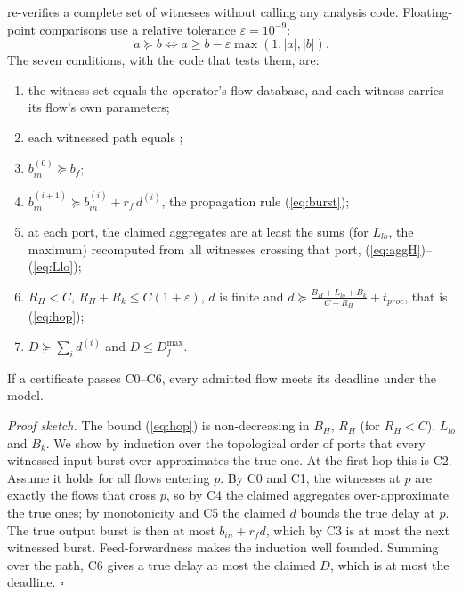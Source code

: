 \documentclass[9pt,a4paper,twocolumn,twoside]{tau-class/tau}
\providecommand{\eqref}[1]{(\ref{#1})}
\begin{document}
         re-verifies a complete set of witnesses without calling any analysis code. Floating-point comparisons use a relative tolerance $\varepsilon = 10^{-9}$:
        \begin{equation}\label{eq:ge}
            a \succeq b \iff a \ge b - \varepsilon \max(1, |a|, |b|).
        \end{equation}
        The seven conditions, with the code that tests them, are:
        \begin{enumerate}
            \item[C0] the witness set equals the operator's flow database, and each witness carries its flow's own parameters;
            \item[C1] each witnessed path equals ;
            \item[C2] $b^{(0)}_{in} \succeq b_f$;
            \item[C3] $b^{(i+1)}_{in} \succeq b^{(i)}_{in} + r_f\, d^{(i)}$, the propagation rule \eqref{eq:burst};
            \item[C4] at each port, the claimed aggregates are at least the sums (for $L_{lo}$, the maximum) recomputed from all witnesses crossing that port, \eqref{eq:aggH}--\eqref{eq:Llo};
            \item[C5] $R_H < C$, $R_H + R_k \le C(1+\varepsilon)$, $d$ is finite and $d \succeq \frac{B_H + L_{lo} + B_k}{C - R_H} + t_{proc}$, that is \eqref{eq:hop};
            \item[C6] $D \succeq \sum_i d^{(i)}$ and $D \le D^{\max}_f$.
        \end{enumerate}

        \begin{tauenv}[frametitle=Proposition (soundness)]
            If a certificate passes C0--C6, every admitted flow meets its deadline under the model.
        \end{tauenv}

        \textit{Proof sketch.} The bound \eqref{eq:hop} is non-decreasing in $B_H$, $R_H$ (for $R_H < C$), $L_{lo}$ and $B_k$. We show by induction over the topological order of ports that every witnessed input burst over-approximates the true one. At the first hop this is C2. Assume it holds for all flows entering $p$. By C0 and C1, the witnesses at $p$ are exactly the flows that cross $p$, so by C4 the claimed aggregates over-approximate the true ones; by monotonicity and C5 the claimed $d$ bounds the true delay at $p$. The true output burst is then at most $b_{in} + r_f d$, which by C3 is at most the next witnessed burst. Feed-forwardness makes the induction well founded. Summing over the path, C6 gives a true delay at most the claimed $D$, which is at most the deadline. \hfill$\square$
\end{document}
